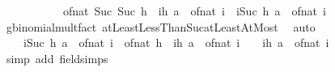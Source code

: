 \begin{isabellebody}
\ \ \isamarkupfalse%
\ \isamarkupfalse%
\ {\isachardoublequoteopen}{\isasymdots}\ {\isacharequal}{\kern0pt}\isanewline
\ \ \ \ of{\isacharunderscore}{\kern0pt}nat\ {\isacharparenleft}{\kern0pt}Suc\ {\isacharparenleft}{\kern0pt}Suc\ h{\isacharparenright}{\kern0pt}{\isacharparenright}{\kern0pt}\ {\isacharasterisk}{\kern0pt}\ {\isacharparenleft}{\kern0pt}{\isasymProd}i{\isacharequal}{\kern0pt}{}{\isachardot}{\kern0pt}{\isachardot}{\kern0pt}h{\isachardot}{\kern0pt}\ a\ {\isacharminus}{\kern0pt}\ of{\isacharunderscore}{\kern0pt}nat\ i{\isacharparenright}{\kern0pt}\ {\isacharplus}{\kern0pt}\ {\isacharparenleft}{\kern0pt}{\isasymProd}i{\isacharequal}{\kern0pt}{}{\isachardot}{\kern0pt}{\isachardot}{\kern0pt}Suc\ h{\isachardot}{\kern0pt}\ a\ {\isacharminus}{\kern0pt}\ of{\isacharunderscore}{\kern0pt}nat\ i{\isacharparenright}{\kern0pt}{\isachardoublequoteclose}\isanewline
\ \ \ \ \isamarkupfalse%
\ gbinomial{\isacharunderscore}{\kern0pt}mult{\isacharunderscore}{\kern0pt}fact\ atLeastLessThanSuc{\isacharunderscore}{\kern0pt}atLeastAtMost\ \isamarkupfalse%
\ auto\isanewline
\ \ \isamarkupfalse%
\ \isamarkupfalse%
\ {\isachardoublequoteopen}{\isasymdots}\ {\isacharequal}{\kern0pt}\isanewline
\ \ \ \ {\isacharparenleft}{\kern0pt}{\isasymProd}i{\isacharequal}{\kern0pt}{}{\isachardot}{\kern0pt}{\isachardot}{\kern0pt}Suc\ h{\isachardot}{\kern0pt}\ a\ {\isacharminus}{\kern0pt}\ of{\isacharunderscore}{\kern0pt}nat\ i{\isacharparenright}{\kern0pt}\ {\isacharplus}{\kern0pt}\ {\isacharparenleft}{\kern0pt}of{\isacharunderscore}{\kern0pt}nat\ h\ {\isacharasterisk}{\kern0pt}\ {\isacharparenleft}{\kern0pt}{\isasymProd}i{\isacharequal}{\kern0pt}{}{\isachardot}{\kern0pt}{\isachardot}{\kern0pt}h{\isachardot}{\kern0pt}\ a\ {\isacharminus}{\kern0pt}\ of{\isacharunderscore}{\kern0pt}nat\ i{\isacharparenright}{\kern0pt}\ {\isacharplus}{\kern0pt}\ {}\ {\isacharasterisk}{\kern0pt}\ {\isacharparenleft}{\kern0pt}{\isasymProd}i{\isacharequal}{\kern0pt}{}{\isachardot}{\kern0pt}{\isachardot}{\kern0pt}h{\isachardot}{\kern0pt}\ a\ {\isacharminus}{\kern0pt}\ of{\isacharunderscore}{\kern0pt}nat\ i{\isacharparenright}{\kern0pt}{\isacharparenright}{\kern0pt}{\isachardoublequoteclose}\isanewline
\ \ \ \ \isamarkupfalse%
\ {\isacharparenleft}{\kern0pt}simp\ add{\isacharcolon}{\kern0pt}\ field{\isacharunderscore}{\kern0pt}simps{\isacharparenright}{\kern0pt}\isanewline
\ \ \isamarkupfalse%
\ \isamarkupfalse%

\end{isabellebody}
